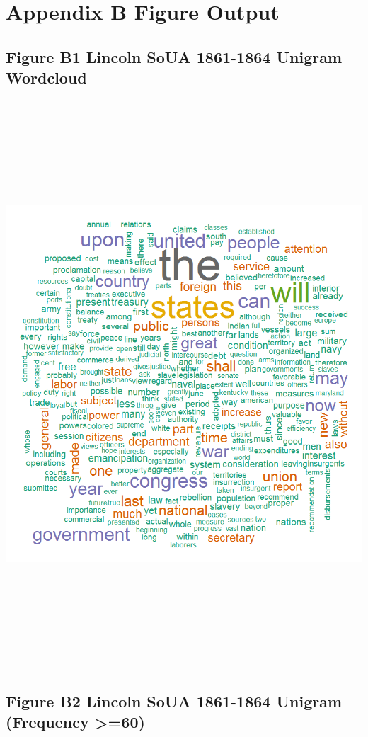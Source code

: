 \documentclass[]{article}
\begin{document}
\section{Appendix B Figure Output}\label{appendix-b-figure-output}

\subsection{Figure B1 Lincoln SoUA 1861-1864 Unigram
Wordcloud}\label{figure-b1-lincoln-soua-1861-1864-unigram-wordcloud}

\includegraphics[height=8.33333in]{images/Lincolndata_unigram_wc.png}

\subsection{Figure B2 Lincoln SoUA 1861-1864 Unigram (Frequency
\textgreater{}=60)}\label{figure-b2-lincoln-soua-1861-1864-unigram-frequency-60}
\end{document}
